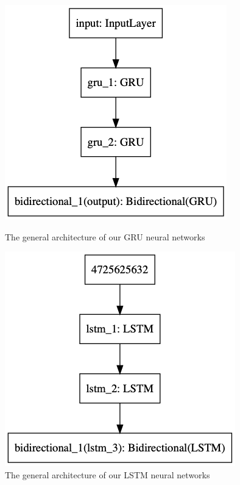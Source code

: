 \begin{figure}[hbt!]
\centering
\begin{minipage}{.5\textwidth}
  \centering
  \includegraphics[width=1\linewidth]{./img/gru_architecture.png}
  \caption{The general architecture of our GRU neural networks}
  \label{fig:gru_architecture}
\end{minipage}%
\begin{minipage}{.5\textwidth}
  \centering
  \includegraphics[width=1\linewidth]{./img/lstm_architecture.png}
  \caption{The general architecture of our LSTM neural networks}
  \label{fig:lstm_architecture}
\end{minipage}
\end{figure}\label{fig:nn_architectures}


